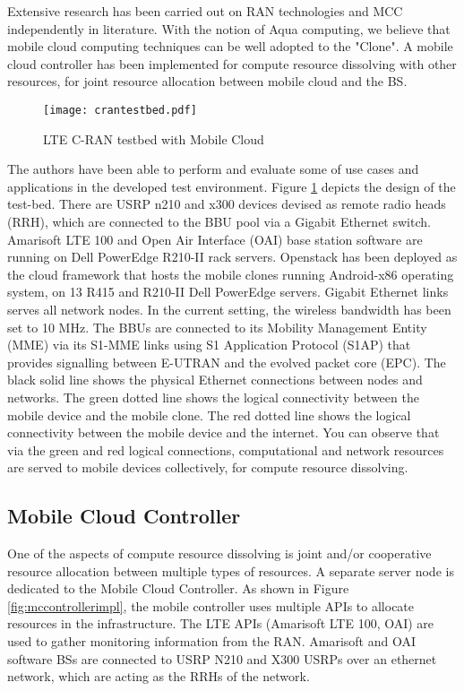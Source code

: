\documentclass[12pt,journal,compsoc, onecolumn]{IEEEtran}
\begin{document}
Extensive research has been carried out on RAN technologies and MCC independently in literature. With the notion of Aqua computing, we believe that mobile cloud computing techniques can be well adopted to the "Clone". A mobile cloud controller has been implemented for compute resource dissolving with other resources, for joint resource allocation between mobile cloud and the BS.

\begin{figure}
\centering
  \texttt{[image: crantestbed.pdf]}
  \caption{\label{fig:crantestbed} LTE C-RAN testbed with Mobile Cloud }
\end{figure}

The authors have been able to perform and evaluate some of use cases and applications in the developed test environment. Figure \ref{fig:crantestbed} depicts the design of the test-bed. There are USRP n210 and x300 devices devised as remote radio heads (RRH), which are connected to the BBU pool via a Gigabit Ethernet switch. Amarisoft LTE 100 and Open Air Interface (OAI) base station software are running on Dell PowerEdge R210-II rack servers. Openstack has been deployed as the cloud framework that hosts the mobile clones running Android-x86 operating system, on 13 R415 and R210-II Dell PowerEdge servers. Gigabit Ethernet links serves all network nodes. In the current setting, the wireless bandwidth has been set to 10 MHz.  The BBUs are connected to its Mobility Management Entity (MME) via its S1-MME links using S1 Application Protocol (S1AP) that provides signalling between E-UTRAN and the evolved packet core (EPC). The black solid line shows the physical Ethernet connections between nodes and networks. The green dotted line shows the logical connectivity between the mobile device and the mobile clone. The red dotted line shows the logical connectivity between the mobile device and the internet.  You can observe that via the green and red logical connections, computational and network resources are served to mobile devices collectively, for compute resource dissolving.

\subsection{Mobile Cloud Controller}

One of the aspects of compute resource dissolving is joint and/or cooperative resource allocation between multiple types of resources. A separate server node is dedicated to the Mobile Cloud Controller. As shown in Figure \ref{fig:mccontrollerimpl}, the mobile controller uses multiple APIs to allocate resources in the infrastructure. The LTE APIs (Amarisoft LTE 100, OAI) are used to gather monitoring information from the RAN. Amarisoft and OAI software BSs are connected to USRP N210 and X300 USRPs over an ethernet network, which are acting as the RRHs of the network.
\end{document}
